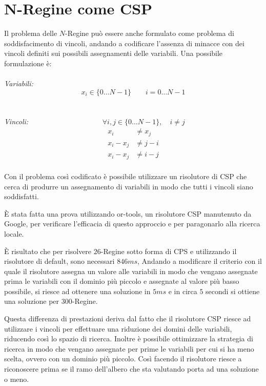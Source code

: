 \clearpage
\section{N-Regine come CSP}\label{app:csp}

Il problema delle $N$-Regine può essere anche formulato come problema di soddisfacimento di vincoli, andando a codificare l'assenza di minacce con dei vincoli definiti sui possibili assegnamenti delle variabili. Una possibile formulazione è:
\\ \\
\textit{Variabili:}
$$
x_i \in \{0 \ldots N - 1\} \qquad i = 0 \ldots N-1
$$
\\ \\
\textit{Vincoli:} $\qquad \qquad  \qquad \qquad  \qquad \forall i, j \in \{0 \ldots N - 1\}, \quad i \neq j$
\begin{align*}
x_i &\neq  x_j  \\
x_i - x_j &\neq j - i \\
x_i - x_j &\neq i - j  \\
\end{align*}

Con il problema così codificato è possibile utilizzare un risolutore di CSP che cerca di produrre un assegnamento di variabili in modo che tutti i vincoli siano soddisfatti.

\`{E} stata fatta una prova utilizzando or-tools, un risolutore CSP manutenuto da Google, per verificare l'efficacia di questo approccio e per paragonarlo alla ricerca locale.

\`{E} risultato che per risolvere $26$-Regine sotto forma di CPS e utilizzando il risolutore di default, sono necessari $846 ms$,
Andando a modificare il criterio con il quale il risolutore assegna un valore alle variabili in modo che vengano assegnate prima le variabili con il dominio più piccolo e assegnate al valore più basso possibile, si riesce ad ottenere una soluzione in $5 ms$ e in circa $5$ secondi si ottiene una soluzione per $300$-Regine.

Questa differenza di prestazioni deriva dal fatto che il risolutore CSP riesce ad utilizzare i vincoli per effettuare una riduzione dei domini delle variabili, riducendo così lo spazio di ricerca. 
Inoltre è possibile ottimizzare la strategia di ricerca in modo che vengano assegnate per prime le variabili per cui si ha meno scelta, ovvero con un dominio più piccolo. 
Così facendo il risolutore riesce a riconoscere prima se il ramo dell'albero che sta valutando porta ad una soluzione o meno.

